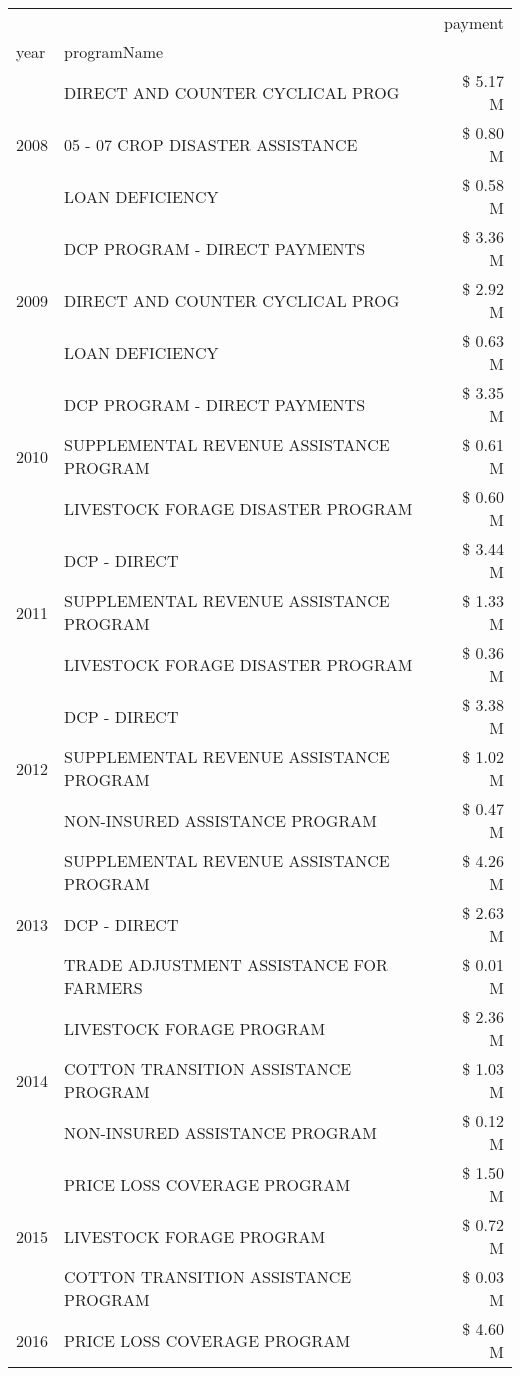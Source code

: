 \begin{tabular}{llr}
\toprule
 &  & payment \\
year & programName &  \\
\midrule
\multirow[t]{3}{*}{2008} & DIRECT AND COUNTER CYCLICAL PROG & \$ 5.17 M \\
 & 05 - 07 CROP DISASTER ASSISTANCE & \$ 0.80 M \\
 & LOAN DEFICIENCY & \$ 0.58 M \\
\cline{1-3}
\multirow[t]{3}{*}{2009} & DCP PROGRAM - DIRECT PAYMENTS & \$ 3.36 M \\
 & DIRECT AND COUNTER CYCLICAL PROG & \$ 2.92 M \\
 & LOAN DEFICIENCY & \$ 0.63 M \\
\cline{1-3}
\multirow[t]{3}{*}{2010} & DCP PROGRAM - DIRECT PAYMENTS & \$ 3.35 M \\
 & SUPPLEMENTAL REVENUE ASSISTANCE PROGRAM & \$ 0.61 M \\
 & LIVESTOCK FORAGE DISASTER  PROGRAM & \$ 0.60 M \\
\cline{1-3}
\multirow[t]{3}{*}{2011} & DCP - DIRECT & \$ 3.44 M \\
 & SUPPLEMENTAL REVENUE ASSISTANCE PROGRAM & \$ 1.33 M \\
 & LIVESTOCK FORAGE DISASTER PROGRAM & \$ 0.36 M \\
\cline{1-3}
\multirow[t]{3}{*}{2012} & DCP - DIRECT & \$ 3.38 M \\
 & SUPPLEMENTAL REVENUE ASSISTANCE PROGRAM & \$ 1.02 M \\
 & NON-INSURED ASSISTANCE PROGRAM & \$ 0.47 M \\
\cline{1-3}
\multirow[t]{3}{*}{2013} & SUPPLEMENTAL REVENUE ASSISTANCE PROGRAM & \$ 4.26 M \\
 & DCP - DIRECT & \$ 2.63 M \\
 & TRADE ADJUSTMENT ASSISTANCE FOR FARMERS & \$ 0.01 M \\
\cline{1-3}
\multirow[t]{3}{*}{2014} & LIVESTOCK FORAGE PROGRAM & \$ 2.36 M \\
 & COTTON TRANSITION ASSISTANCE PROGRAM & \$ 1.03 M \\
 & NON-INSURED ASSISTANCE PROGRAM & \$ 0.12 M \\
\cline{1-3}
\multirow[t]{3}{*}{2015} & PRICE LOSS COVERAGE PROGRAM & \$ 1.50 M \\
 & LIVESTOCK FORAGE PROGRAM & \$ 0.72 M \\
 & COTTON TRANSITION ASSISTANCE PROGRAM & \$ 0.03 M \\
\cline{1-3}
\multirow[t]{3}{*}{2016} & PRICE LOSS COVERAGE PROGRAM & \$ 4.60 M \\

\end{tabular}

